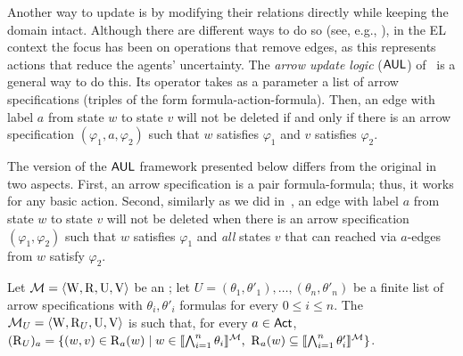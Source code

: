 Another way to update \ltss is by modifying their relations directly while keeping the domain intact. Although there are different ways to do so (see, e.g., \cite{ArecesFH15}), in the EL context the focus has been on operations that remove edges, as this represents actions that reduce the agents' uncertainty. The \emph{arrow update logic} ($\mathsf{AUL}$) of~\cite{KooiR11} is a general way to do this. Its operator takes as a parameter a list of arrow specifications (triples of the form formula-action-formula). Then, an edge with label $a$ from state $w$ to state $v$ will not be deleted if and only if there is an arrow specification $(\varphi_1, a, \varphi_2)$ such that $w$ satisfies $\varphi_1$ and $v$ satisfies $\varphi_2$. 


The version of the $\mathsf{AUL}$ framework presented below differs from the original in two aspects. First, an arrow specification is a pair formula-formula; thus, it works for any basic action. Second, similarly as we did in~, an edge with label $a$ from state $w$ to state $v$ will not be deleted when there is an arrow specification $(\varphi_1, \varphi_2)$ such that $w$ satisfies $\varphi_1$ and \emph{all} states $v$ that can reached via $a$-edges from $w$ satisfy $\varphi_2$.


\medskip 

\begin{definition}
Let $\mathcal{M} = \langle \operatorname{W}, \operatorname{R}, \operatorname{U}, \operatorname{V} \rangle$ be an \ults; let $U = (\theta_1,\theta'_1),\dots,(\theta_n,\theta'_n)$ be a finite list of arrow specifications with $\theta_i,\theta'_i$ formulas for every $0\leq i \leq n$. The \ults $\mathcal{M}_{{U}} = \langle \operatorname{W}, \operatorname{R}_{{U}}, \operatorname{U},\operatorname{V} \rangle$ is such that, for every $a\in{\rm \sf Act}$,
	$(\operatorname{R}_{{U}})_a = \{ (w,v) \in \operatorname{R}_a(w) \mid w \in \llbracket \bigwedge_{i=1}^n \theta_i \rrbracket^{\mathcal{M}} \text{, } \operatorname{R}_a(w) \subseteq \llbracket \bigwedge_{i=1}^n \theta'_i \rrbracket^{\mathcal{M}} \}$.
\end{definition}

